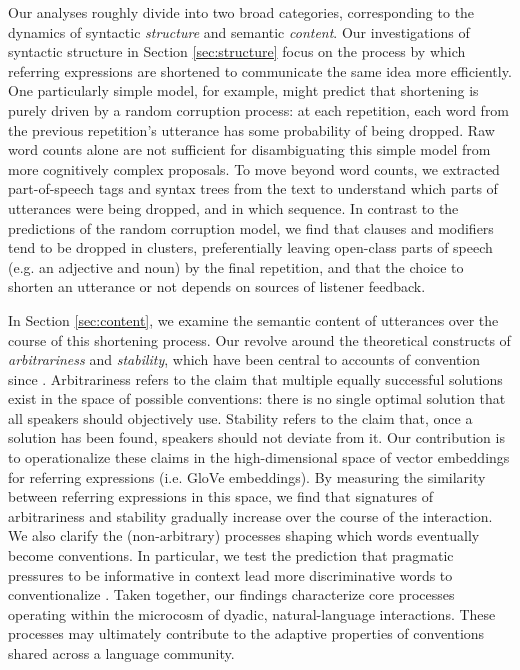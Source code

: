 \documentclass[alpha-refs]{wiley-article}
\newcommand{\ndg}[1]{\textcolor{green}{[ndg: #1]}}
\begin{document}
Our analyses roughly divide into two broad categories, corresponding to the dynamics of syntactic \emph{structure} and semantic \emph{content}.
Our investigations of syntactic structure in Section \ref{sec:structure} focus on the process by which referring expressions are shortened to communicate the same idea more efficiently.
One particularly simple model, for example, might predict that shortening is purely driven by a random corruption process: at each repetition, each word from the previous repetition's utterance has some probability of being dropped.
Raw word counts alone are not sufficient for disambiguating this simple model from more cognitively complex proposals.
To move beyond word counts, we extracted part-of-speech tags and syntax trees from the text to understand which parts of utterances were being dropped, and in which sequence.
In contrast to the predictions of the random corruption model, we find that clauses and modifiers tend to be dropped in clusters, preferentially leaving open-class parts of speech (e.g. an adjective and noun) by the final repetition, and that the choice to shorten an utterance or not depends on sources of listener feedback.  %

In Section \ref{sec:content}, we examine the semantic content of utterances over the course of this shortening process.
Our revolve around the theoretical constructs of \emph{arbitrariness} and \emph{stability}, which have been central to accounts of convention since \cite{Lewis69_Convention}.
Arbitrariness refers to the claim that multiple equally successful solutions exist in the space of possible conventions: there is no single optimal solution that all speakers should objectively use.
Stability refers to the claim that, once a solution has been found, speakers should not deviate from it.
Our contribution is to operationalize these claims in the high-dimensional space of vector embeddings for referring expressions (i.e. GloVe embeddings).
By measuring the similarity between referring expressions in this space, we find that signatures of arbitrariness and stability gradually increase over the course of the interaction.
We also clarify the (non-arbitrary) processes shaping which words eventually become conventions.
In particular, we test the prediction that pragmatic pressures to be informative in context lead more discriminative words to conventionalize \citep{KirbyTamarizCornishSmith15_CompressionCommunication,GibsonEtAl17_ColorNamingUse,hawkins_emerging_abstractions_2018}.
Taken together, our findings characterize core processes operating within the microcosm of dyadic, natural-language interactions. These processes may ultimately contribute to the adaptive properties of conventions shared across a language community.
\end{document}
